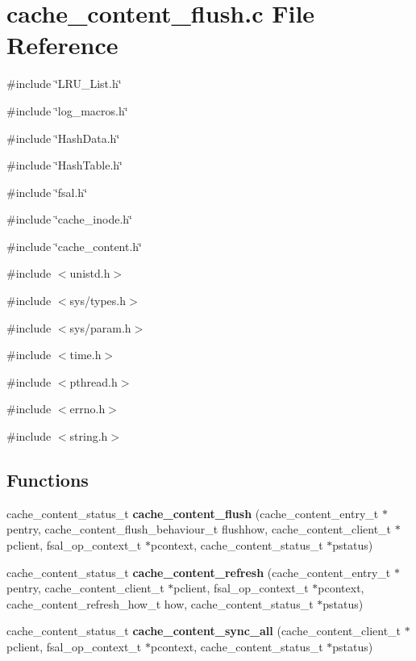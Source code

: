 \section{cache\_\-content\_\-flush.c File Reference}
\label{cache__content__flush_8c}
{\ttfamily \#include \char`\"{}LRU\_\-List.h\char`\"{}}\par
{\ttfamily \#include \char`\"{}log\_\-macros.h\char`\"{}}\par
{\ttfamily \#include \char`\"{}HashData.h\char`\"{}}\par
{\ttfamily \#include \char`\"{}HashTable.h\char`\"{}}\par
{\ttfamily \#include \char`\"{}fsal.h\char`\"{}}\par
{\ttfamily \#include \char`\"{}cache\_\-inode.h\char`\"{}}\par
{\ttfamily \#include \char`\"{}cache\_\-content.h\char`\"{}}\par
{\ttfamily \#include $<$unistd.h$>$}\par
{\ttfamily \#include $<$sys/types.h$>$}\par
{\ttfamily \#include $<$sys/param.h$>$}\par
{\ttfamily \#include $<$time.h$>$}\par
{\ttfamily \#include $<$pthread.h$>$}\par
{\ttfamily \#include $<$errno.h$>$}\par
{\ttfamily \#include $<$string.h$>$}\par
\subsection*{Functions}
\begin{DoxyCompactItemize}
\item 
cache\_\-content\_\-status\_\-t {\bf cache\_\-content\_\-flush} (cache\_\-content\_\-entry\_\-t $\ast$pentry, cache\_\-content\_\-flush\_\-behaviour\_\-t flushhow, cache\_\-content\_\-client\_\-t $\ast$pclient, fsal\_\-op\_\-context\_\-t $\ast$pcontext, cache\_\-content\_\-status\_\-t $\ast$pstatus)
\item 
cache\_\-content\_\-status\_\-t {\bf cache\_\-content\_\-refresh} (cache\_\-content\_\-entry\_\-t $\ast$pentry, cache\_\-content\_\-client\_\-t $\ast$pclient, fsal\_\-op\_\-context\_\-t $\ast$pcontext, cache\_\-content\_\-refresh\_\-how\_\-t how, cache\_\-content\_\-status\_\-t $\ast$pstatus)
\item 
cache\_\-content\_\-status\_\-t {\bf cache\_\-content\_\-sync\_\-all} (cache\_\-content\_\-client\_\-t $\ast$pclient, fsal\_\-op\_\-context\_\-t $\ast$pcontext, cache\_\-content\_\-status\_\-t $\ast$pstatus)
\end{DoxyCompactItemize}


